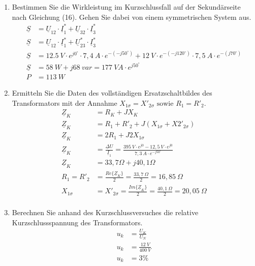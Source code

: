\begin{enumerate}[label=\alph*)]
	\item Bestimmen Sie die Wirkleistung im Kurzschlussfall auf der Sekundärseite nach
	      Gleichung (16). Gehen Sie dabei von einem symmetrischen System aus.
	      \begin{align*}
		      \underline S & = \underline U_{12} \cdot \underline I_1^* + \underline U_{32}\cdot \underline I_3^*   \\
		      \underline S & = \underline U_{12} \cdot \underline I_1^* + \underline U_{23}^*\cdot \underline I_3^* \\
		      \underline S & = 12.5\ V \cdot e^{j0^\circ} \cdot 7,4\ A \cdot e^{-(-j50^\circ)}
		      + 12\ V \cdot e^{-(-j120^\circ)}\cdot 7,5\ A \cdot e^{-(j70^\circ)}                                   \\
		      \underline S & = 58\ W+j 68\ var = 177\ VA \cdot e^{j50^\circ}                                        \\
		      P            & = 113\ W
	      \end{align*}

	\item Ermitteln Sie die Daten des vollständigen Ersatzschaltbildes des Transformators
	      mit der Annahme $X_{1\sigma} = X'_{2\sigma} \text{ sowie } R_1 = R'_2$.
	      \begin{align*}
		      \underline Z_K & = R_K + JX_{K}                                                                                 \\
		      \underline Z_K & = R_1 + R'_2 + J(X_{1\sigma} + X2'_{2\sigma})                                                  \\
		      \underline Z_K & = 2R_1 + J2X_{1\sigma}                                                                         \\
		      \underline Z_K & = \frac{\underline \Delta U}{\underline I_1} = \frac{395\ V\cdot e^{j0} - 12,5\ V\cdot e^{j0}}
		      {7,3\ A \cdot e^{-j50^\circ}}                                                                                   \\
		      \underline Z_K & = 33,7 \Omega + j40,1 \Omega                                                                   \\
		      R_1 = R'_2     & = \frac {Re\{\underline Z_K\}}{2} = \frac{33,7\ \Omega}{2} = 16,85\ \Omega                     \\
		      X_{1\sigma}    & = X'_{2\sigma} = \frac {Im\{\underline Z_K\}}{2} = \frac{40,1\ \Omega}{2} = 20,05\ \Omega      \\
	      \end{align*}

	\item Berechnen Sie anhand des Kurzschlussversuches die relative Kurzschlussspannung
	      des Transformators.
	      \begin{align*}
		      u_k & = \frac{U_K}{U_N}      \\
		      u_k & = \frac{12\ V}{400\ V} \\
		      u_k & = 3\%
	      \end{align*}

\end{enumerate}

